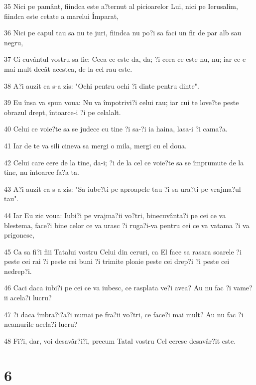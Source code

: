 \par 35 Nici pe pamânt, fiindca este a?ternut al picioarelor Lui, nici pe Ierusalim, fiindca este cetate a marelui Împarat,
\par 36 Nici pe capul tau sa nu te juri, fiindca nu po?i sa faci un fir de par alb sau negru,
\par 37 Ci cuvântul vostru sa fie: Ceea ce este da, da; ?i ceea ce este nu, nu; iar ce e mai mult decât acestea, de la cel rau este.
\par 38 A?i auzit ca s-a zis: "Ochi pentru ochi ?i dinte pentru dinte".
\par 39 Eu însa va spun voua: Nu va împotrivi?i celui rau; iar cui te love?te peste obrazul drept, întoarce-i ?i pe celalalt.
\par 40 Celui ce voie?te sa se judece cu tine ?i sa-?i ia haina, lasa-i ?i cama?a.
\par 41 Iar de te va sili cineva sa mergi o mila, mergi cu el doua.
\par 42 Celui care cere de la tine, da-i; ?i de la cel ce voie?te sa se împrumute de la tine, nu întoarce fa?a ta.
\par 43 A?i auzit ca s-a zis: "Sa iube?ti pe aproapele tau ?i sa ura?ti pe vrajma?ul tau".
\par 44 Iar Eu zic voua: Iubi?i pe vrajma?ii vo?tri, binecuvânta?i pe cei ce va blestema, face?i bine celor ce va urasc ?i ruga?i-va pentru cei ce va vatama ?i va prigonesc,
\par 45 Ca sa fi?i fiii Tatalui vostru Celui din ceruri, ca El face sa rasara soarele ?i peste cei rai ?i peste cei buni ?i trimite ploaie peste cei drep?i ?i peste cei nedrep?i.
\par 46 Caci daca iubi?i pe cei ce va iubesc, ce rasplata ve?i avea? Au nu fac ?i vame?ii acela?i lucru?
\par 47 ?i daca îmbra?i?a?i numai pe fra?ii vo?tri, ce face?i mai mult? Au nu fac ?i neamurile acela?i lucru?
\par 48 Fi?i, dar, voi desavâr?i?i, precum Tatal vostru Cel ceresc desavâr?it este.

\chapter{6}

